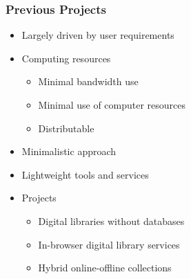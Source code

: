 \documentclass[xcolor=dvitex,t,11pt]{beamer}
\begin{document}
\begin{frame}[fragile]
\frametitle{Previous Projects}
\begin{itemize}
\item Largely driven by user requirements
\item Computing resources
\begin{itemize}
\item Minimal bandwidth use
\item Minimal use of computer resources
\item Distributable
\end{itemize}
\item Minimalistic approach
\item Lightweight tools and services
\item Projects
\begin{itemize}
\item Digital libraries without databases
\item In-browser digital library services
\item Hybrid online-offline collections
\end{itemize}
\end{itemize}
\end{frame}

\end{document}
